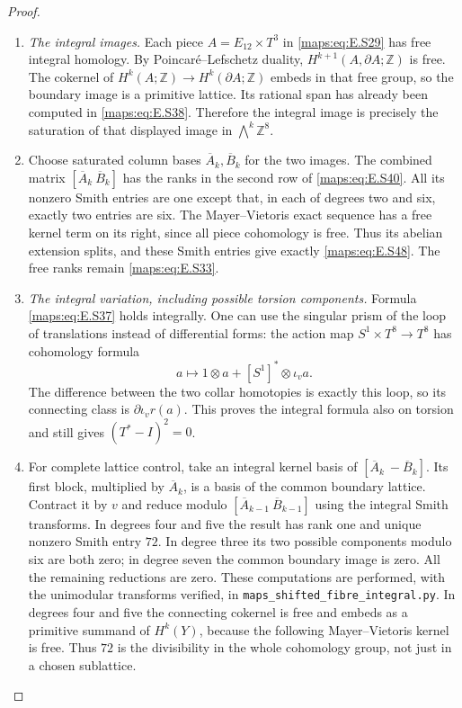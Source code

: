 \begin{proof}
\begin{enumerate}[label={$\langle1\rangle$\arabic*.},leftmargin=*]
\item \emph{The integral images.}
Each piece $A=E_{12}\times T^3$ in \eqref{maps:eq:E.S29} has free
integral homology. By Poincar\'e--Lefschetz duality,
$H^{k+1}(A,\partial A;\mathbb Z)$ is free. The cokernel
of $H^k(A;\mathbb Z)\to H^k(\partial A;\mathbb Z)$
embeds in that free group, so the boundary image is a
primitive lattice. Its rational span has already been
computed in \eqref{maps:eq:E.S38}. Therefore the integral
image is precisely the saturation of that displayed
image in $\bigwedge^k\mathbb Z^8$.

\item Choose saturated column bases $\overline A_k,\overline B_k$
for the two images. The combined matrix
$[\overline A_k\ \overline B_k]$ has the ranks in the
second row of \eqref{maps:eq:E.S40}. All its nonzero Smith entries are
one except that, in each of degrees two and six, exactly
two entries are six. The Mayer--Vietoris exact sequence
has a free kernel term on its right, since all piece
cohomology is free. Thus its abelian extension splits,
and these Smith entries give exactly \eqref{maps:eq:E.S48}. The free
ranks remain \eqref{maps:eq:E.S33}.

\item \emph{The integral variation, including possible torsion components.}
Formula \eqref{maps:eq:E.S37} holds integrally. One can use the singular
prism of the loop of translations instead of differential
forms: the action map $S^1\times T^8\to T^8$ has
cohomology formula
\[
 a\longmapsto 1\otimes a+[S^1]^*\otimes\iota_v a.
\]
The difference between the two collar homotopies is
exactly this loop, so its connecting class is
$\partial\iota_v r(a)$. This proves the integral formula
also on torsion and still gives $(T^*-I)^2=0$.

\item For complete lattice control, take an integral kernel
basis of $[\overline A_k\ -\overline B_k]$. Its first
block, multiplied by $\overline A_k$, is a basis of the
common boundary lattice. Contract it by $v$ and reduce
modulo $[\overline A_{k-1}\ \overline B_{k-1}]$ using
the integral Smith transforms. In degrees four and five
the result has rank one and unique nonzero Smith entry
$72$. In degree three its two possible components
modulo six are both zero; in degree seven the common
boundary image is zero. All the remaining reductions
are zero. These computations are performed, with the
unimodular transforms verified, in
\texttt{maps\_shifted\_fibre\_integral.py}.
In degrees four and five the connecting cokernel is
free and embeds as a primitive summand of $H^k(Y)$,
because the following Mayer--Vietoris kernel is free.
Thus $72$ is the divisibility in the whole cohomology
group, not just in a chosen sublattice.


\end{enumerate}
\end{proof}
